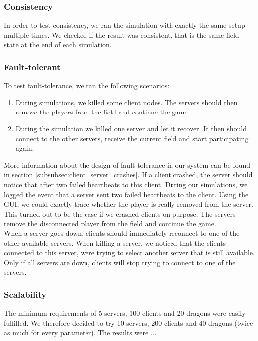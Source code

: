 	\subsubsection{Consistency}
	\label{subsubsec:consistency}
		In order to test consistency, we ran the simulation with exactly the same setup multiple times.
		We checked if the result was consistent, that is the same field state at the end of each simulation. 
		
	\subsubsection{Fault-tolerant}
	\label{subsubsec:fault-tolerant}
		To test fault-tolerance, we ran the following scenarios:
		\begin{enumerate}
			\item During simulations, we killed some client nodes. The servers should then remove the players from the field and continue the game.
			\item During the simulation we killed one server and let it recover. It then should connect to the other servers, receive the current field and start participating again.
		\end{enumerate}
		
		More information about the design of fault tolerance in our system can be found in section \ref{subsubsec:client_server_crashes}. If a client crashed, the server should notice that after two failed heartbeats to this client. During our simulations, we logged the event that a server sent two failed heartbeats to the client. Using the GUI, we could exactly trace whether the player is really removed from the server. This turned out to be the case if we crashed clients on purpose. The servers remove the disconnected player from the field and continue the game.\\
		When a server goes down, clients should immediately reconnect to one of the other available servers. When killing a server, we noticed that the clients connected to this server, were trying to select another server that is still available. Only if all servers are down, clients will stop trying to connect to one of the servers.
		
	\subsubsection{Scalability}
	\label{subsubsec:scalability}
		The minimum requirements of 5 servers, 100 clients and 20 dragons were easily fulfilled. We therefore decided to try 10 servers, 200 clients and 40 dragons (twice as much for every parameter). The results were ...
		
